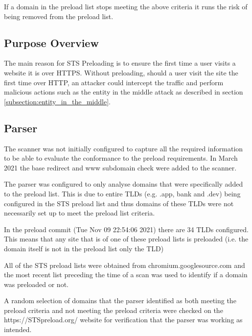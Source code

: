\documentclass{mscreport}
\begin{document}
\vspace{0.3cm} \noindent
If a domain in the preload list stops meeting the above criteria it runs the risk of being removed from the preload list.

\subsection{Purpose Overview}

\noindent
The main reason for STS Preloading is to ensure the first time a user visits a website it is over HTTPS. Without preloading, should a user visit the site the first time over HTTP, an attacker could intercept the traffic and perform malicious actions such as the entity in the middle attack as described in section \ref{subsection:entity_in_the_middle}.

\subsection{Parser}

\noindent
The scanner was not initially configured to capture all the required information to be able to evaluate the conformance to the preload requirements. In March 2021 the base redirect and www subdomain check were added to the scanner.

\vspace{0.3cm} \noindent
The parser was configured to only analyse domains that were specifically added to the preload list. This is due to entire TLDs (e.g. .app, bank and .dev) being configured in the STS preload list and thus domains of these TLDs were not necessarily set up to meet the preload list criteria.

\vspace{0.3cm} \noindent
In the preload commit (Tue Nov 09 22:54:06 2021) there are 34 TLDs configured. This means that any site that is of one of these preload lists is preloaded (i.e. the domain itself is not in the preload list only the TLD)

\vspace{0.3cm} \noindent
All of the STS preload lists were obtained from chromium.googlesource.com and the most recent list preceding the time of a scan was used to identify if a domain was preloaded or not.

\vspace{0.3cm} \noindent
A random selection of domains that the parser identified as both meeting the preload criteria and not meeting the preload criteria were checked on the https://STSpreload.org/ website for verification that the parser was working as intended.
\end{document}
